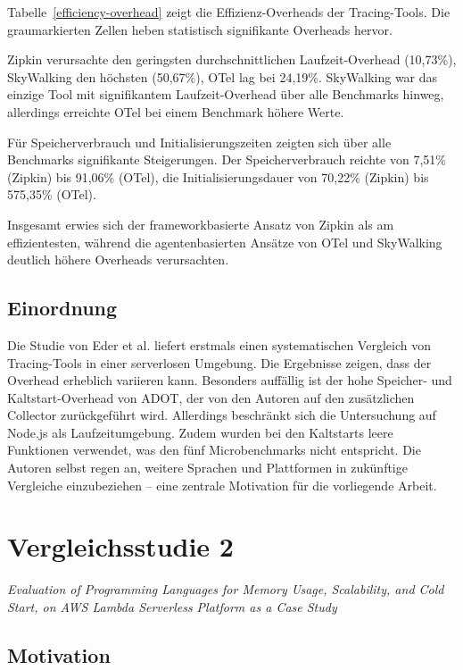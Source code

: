 Tabelle~\ref{efficiency-overhead} zeigt die Effizienz-Overheads der Tracing-Tools. Die graumarkierten Zellen heben statistisch signifikante Overheads hervor.

Zipkin verursachte den geringsten durchschnittlichen Laufzeit-Overhead (10,73\%), SkyWalking den höchsten (50,67\%), OTel lag bei 24,19\%. SkyWalking war das einzige Tool mit signifikantem Laufzeit-Overhead über alle Benchmarks hinweg, allerdings erreichte OTel bei einem Benchmark höhere Werte.

Für Speicherverbrauch und Initialisierungszeiten zeigten sich über alle Benchmarks signifikante Steigerungen. Der Speicherverbrauch reichte von 7,51\% (Zipkin) bis 91,06\% (OTel), die Initialisierungsdauer von 70,22\% (Zipkin) bis 575,35\% (OTel). 

Insgesamt erwies sich der frameworkbasierte Ansatz von Zipkin als am effizientesten, während die agentenbasierten Ansätze von OTel und SkyWalking deutlich höhere Overheads verursachten.

\subsection{Einordnung}
\label{subsec:eder-discussion}

Die Studie von Eder et al. liefert erstmals einen systematischen Vergleich von Tracing-Tools in einer serverlosen 
Umgebung. Die Ergebnisse zeigen, dass der Overhead erheblich variieren kann. Besonders auffällig ist der hohe 
Speicher- und Kaltstart-Overhead von ADOT, der von den Autoren auf den zusätzlichen Collector zurückgeführt wird.
Allerdings beschränkt sich die Untersuchung auf Node.js als Laufzeitumgebung. 
Zudem wurden bei den Kaltstarts leere Funktionen verwendet, was den fünf Microbenchmarks nicht entspricht. 
Die Autoren selbst regen an, weitere Sprachen und Plattformen in zukünftige Vergleiche einzubeziehen – eine 
zentrale Motivation für die vorliegende Arbeit.

\section{Vergleichsstudie 2}
\label{sec:rodriguez-2023}
\emph{\glqq Evaluation of Programming Languages for Memory Usage, Scalability, and Cold Start, on AWS Lambda Serverless Platform as a Case Study\grqq }

\subsection{Motivation}
\label{subsec:rodriguez-motivation}


